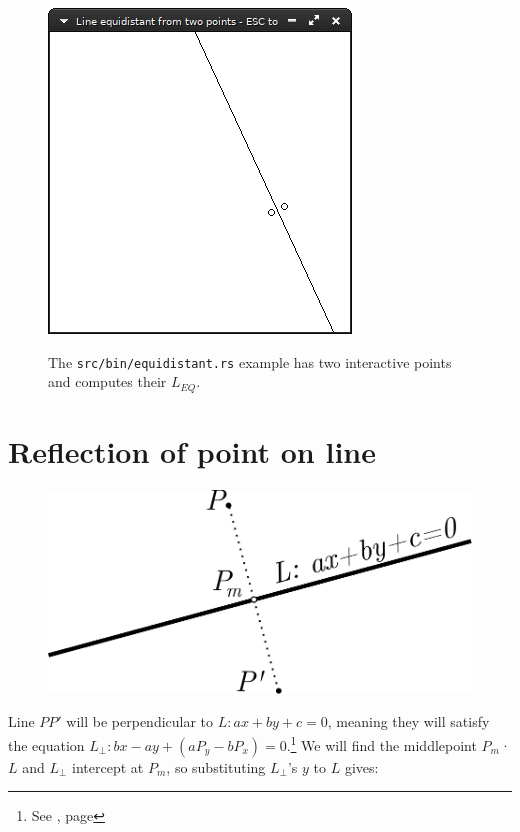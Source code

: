 \documentclass[12pt,openany,a4,usenames,dvipsnames]{book}
\DeclareRobustCommand{\Caption}[1]{\par%
  \vspace{1em}
  {\noindent{}#1}}
\begin{document}
\begin{figure}[H]
\begin{minipage}{0.49\textwidth}
    \includegraphics[width=\textwidth,keepaspectratio]{figures/equidistant2.png}
  \end{minipage}
  \Caption{The \texttt{src/bin/equidistant.rs} example has two interactive points and computes their $L_{EQ}$.}
\end{figure}
%
%
%
%
%
\chapter{Reflection of point on line}
\begin{figure}[H]
\centering
\includegraphics[height=8\baselineskip,keepaspectratio]{figures/mirror.pdf}
\end{figure}
Line $PP'$ will be perpendicular to $L: ax+by+c=0$, meaning they will satisfy the equation $L_{⊥}: bx-ay+(aP_y-bP_x)=0$.\footnote{See \emph{}, page \pageref{ch:perpendicular}} We will find the middlepoint $P_m$· $L$ and $L_{⊥}$ intercept at $P_m$, so substituting $L_{⊥}$'s $y$ to $L$ gives:
\end{document}
